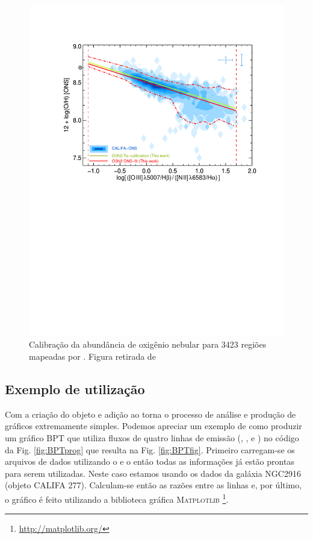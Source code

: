 \begin{figure}
	\centering
	\includegraphics[scale=0.8, trim=2cm 13cm 2cm 3cm, clip]{figuras/O3N2_CALIFA.pdf}
	\caption[Calibração da abundância de oxigênio no gás]{Calibração da abundância de oxigênio 
	nebular	para 3423 regiões \Hii mapeadas por \citet{Sanchez.etal.2013a}. Figura retirada de 
	\citet{Marino.etal.2013a}}
	\label{fig:Marino2013_O3N2}
\end{figure}

\subsection{Exemplo de utilização}
\label{sec:emline:datacube:exemple}

Com a criação do objeto \emldc e adição ao \pycasso torna o processo de análise e produção de
gráficos extremamente simples. Podemos apreciar um exemplo de como produzir um gráfico BPT
\citep{Baldwin.Phillips.Terlevich.1981a} que utiliza fluxos de quatro linhas de emissão (\Halpha,
\Hbeta, \OIII e \NII) no código da Fig. \ref{fig:BPTprog} que resulta na Fig. \ref{fig:BPTfig}.
Primeiro carregam-se os arquivos de dados utilizando o \pycasso e o \emldc então todas as
informações já estão prontas para serem utilizadas. Neste caso estamos usando os dados da galáxia
NGC2916 (objeto CALIFA 277). Calculam-se então as razões entre as linhas e, por último, o gráfico é
feito utilizando a biblioteca gráfica M\textsc{atplotlib} \footnote{
	\href{http://matplotlib.org/}{http://matplotlib.org/}
}.

